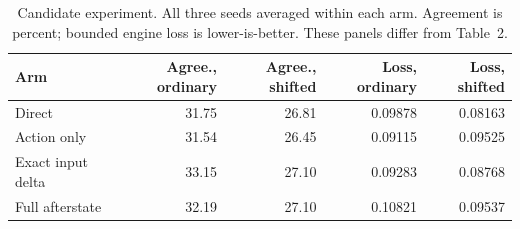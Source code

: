 \begin{table}[t]
\centering\small
\caption{Candidate experiment. All three seeds averaged within each arm. Agreement is percent; bounded engine loss is lower-is-better. These panels differ from Table~2.}
\begin{tabular}{lrrrr}
\toprule
Arm & Agree., ordinary & Agree., shifted & Loss, ordinary & Loss, shifted \\
\midrule
Direct & 31.75 & 26.81 & 0.09878 & 0.08163 \\
Action only & 31.54 & 26.45 & 0.09115 & 0.09525 \\
Exact input delta & 33.15 & 27.10 & 0.09283 & 0.08768 \\
Full afterstate & 32.19 & 27.10 & 0.10821 & 0.09537 \\
\bottomrule
\end{tabular}
\end{table}
